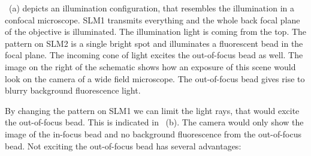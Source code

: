 ~(a) depicts an illumination configuration,
that resembles the illumination in a confocal microscope. SLM1
transmits everything and the whole back focal plane of the objective
is illuminated. The illumination light is coming from the top.  The
pattern on SLM2 is a single bright spot and illuminates a fluorescent
bead in the focal plane. The incoming cone of light excites the
out-of-focus bead as well. The image on the right of the schematic
shows how an exposure of this scene would look on the camera of a wide
field microscope. The out-of-focus bead gives rise to blurry
background fluorescence light.

By changing the pattern on SLM1 we can limit the light rays, that
would excite the out-of-focus bead. This is indicated in
~(b). The camera would only show the image
of the in-focus bead and no background fluorescence from the
out-of-focus bead. Not exciting the out-of-focus bead has several
advantages:
